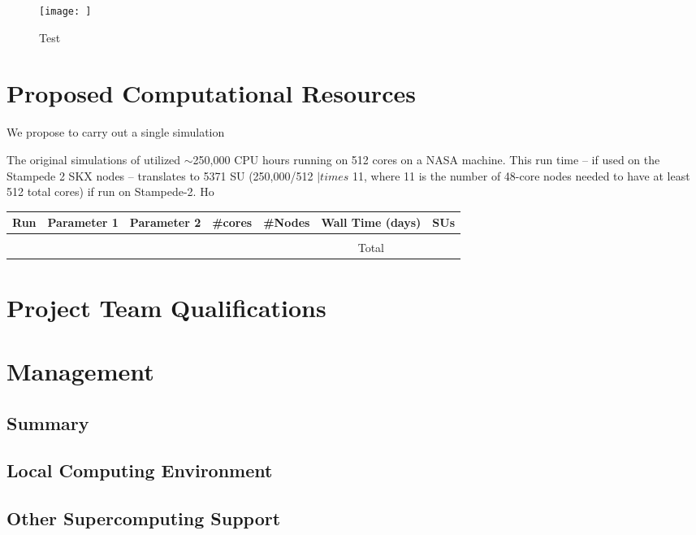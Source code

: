 \documentclass[12pt]{article} %
\begin{document}
\begin{figure}
\centering
\texttt{[image: ]}
\caption{Test}
\label{fig:schematic}
\end{figure}

\section{Proposed Computational Resources}

We propose to carry out a single simulation


The original simulations of \cite{Wise2012a} utilized $\sim$250,000 CPU hours running on 512 cores on a NASA machine. This run time -- if used on the Stampede 2 SKX nodes -- translates to 5371 SU (250,000/512 $|times$ 11, where 11 is the number of 48-core nodes needed to have at least 512 total cores) if run on Stampede-2. Ho

\begin{tabular}{c|c|c|c|c|c|c}
\hline
\hline
 Run & Parameter 1 & Parameter 2 & \#cores & \#Nodes & Wall Time (days) & \textbf{SUs} \\
 \hline
     & & & & & & \\
 \hline
 & & & & & Total &
\end{tabular}


\section{Project Team Qualifications}

\section{Management}
\subsection{Summary}
\subsection{Local Computing Environment}
\subsection{Other Supercomputing Support}


\def\bibfont{\footnotesize}

\end{document}

